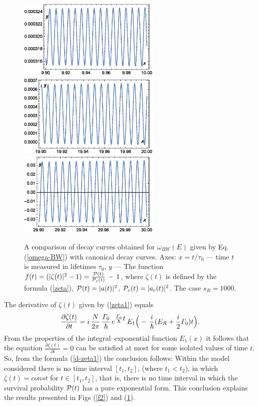 \documentclass[12pt]{article}
\begin{document}
\begin{figure}[h!]
\begin{center}
\includegraphics[width=68mm]{f4b.eps}\\
\includegraphics[width=68mm]{f4c.eps}\\
\includegraphics[width=68mm]{f4d.eps}\\
\caption{A comparison of decay curves obtained for $\omega_{BW}(E)$ given by Eq. (\ref{omega-BW}) with canonical decay curves.
Axes: $x =t / \tau_{0} $ --- time $t$ is measured in lifetimes
$\tau_{0}$,   $y$ --- The function $f(t) = (|\zeta (t)|^{2} -1) = \frac{{\cal P}(t)}{{\cal P}_{c}(t)}\, - \,1$, where $\zeta (t)$ is defined by the formula (\ref{zeta}), ${\cal P}(t) = |a(t)|^{2}$,
${\cal P}_{c}(t) = |a_{c}(t)|^{2}$. The case  $s_{R} = 1000$.  }
  \label{f3}
\end{center}
\end{figure}

The derivative of $\zeta (t)$ given by (\ref{zeta1}) equals \cite{ku-2008,ku-2009}
\begin{equation}
\frac{\partial \zeta (t)}{\partial t} = i\,\frac{N}{2\pi}\,\frac{{\it\Gamma}_{0}}{\hbar}\,e^{\textstyle{ \frac{{\it\Gamma}_{0}}{\hbar}t}}\,
E_{1}\Big(-\,\frac{i}{\hbar}(E_{R}+ \frac{i}{2}{\it\Gamma}_{0})t\Big). \label{d-zeta1}
\end{equation}
From the properties of the integral--exponential function $E_{1}(x)$ it follows that
the equation $\frac{\partial \zeta (t)}{\partial t} =0$ can be  satisfied at most for some isolated values of time  $t$.
So,
from the  formula (\ref{d-zeta1}) the conclusion follows: Within the model considered there is no time interval $[t_{1}, t_{2}]$, (where $t_{1} < t_{2}$),  in which $\zeta(t) = const$ for  $t \in [t_{1}, t_{2}]$, that is, there is no time interval in which
the survival probability ${\cal P}(t)$ has a pure exponential form.
This conclusion explains the results presented in Figs (\ref{f2}) and (\ref{f3}).
\end{document}
